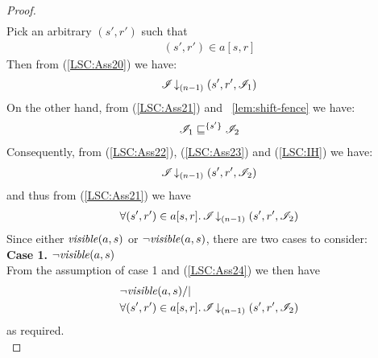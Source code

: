 \begin{lemma}
\begin{proof}
\begin{align}
	\label{LSC:Ass20}
\end{align}
%
Pick an arbitrary $(s', r')$ such that 
%
\begin{align}
	(s', r') \in a[s, r] \label{LSC:Ass21}
\end{align}
%
Then from (\ref{LSC:Ass20}) we have:
%
\begin{align}
	\mathscr{I} \!\downarrow_{(n-1)} \left(s', r', \mathscr{I}_1\right)
	\label{LSC:Ass22}
\end{align}
%
On the other hand, from (\ref{LSC:Ass21}) and \lem~\ref{lem:shift-fence} we have:
%
\begin{align}
	\mathscr{I}_1 \sqsubseteq^{\{s'\}} \mathscr{I}_2 
	\label{LSC:Ass23}
\end{align}
%
Consequently, from (\ref{LSC:Ass22}), (\ref{LSC:Ass23}) and (\ref{LSC:IH}) we have:
%
\begin{align*}
	\mathscr{I} \!\downarrow_{(n-1)} \left(s', r', \mathscr{I}_2\right)
\end{align*}
%
and thus from (\ref{LSC:Ass21}) we have
%
\begin{align}
	\forall (s', r') \in a[s, r].\, \mathscr{I} \!\downarrow_{(n-1)} \left(s', r', \mathscr{I}_2\right)
	\label{LSC:Ass24}
\end{align}
%
Since either $\mathit{visible}(a, s)$ or $\neg\mathit{visible}(a, s)$, there are two cases to consider:\\

\noindent\textbf{Case 1. } $ \neg \mathit{visible}(a, s)$\\
From the assumption of case 1 and (\ref{LSC:Ass24}) we then have
%
\begin{align*}
	& \neg\mathit{visible}(a, s) /| \\
	&\forall (s', r') \in a[s, r].\, \mathscr{I} \!\downarrow_{(n-1)} \left(s', r', \mathscr{I}_2\right)
\end{align*}
%
as required.\\
%
%
%
%


\end{proof}
\end{lemma}
